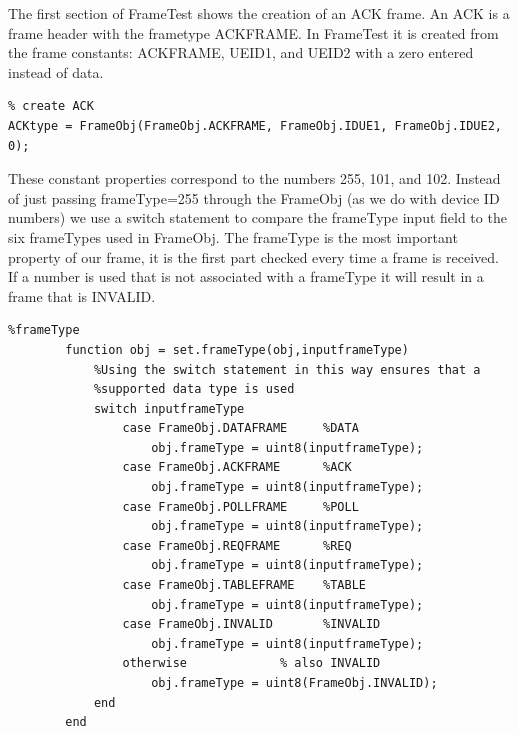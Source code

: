 The first section of FrameTest shows the creation of an ACK frame. An ACK is a frame header with the frametype ACKFRAME. In FrameTest it is created from the frame constants: ACKFRAME, UEID1, and UEID2 with a zero entered instead of data.   
\begin{lstlisting}
% create ACK
ACKtype = FrameObj(FrameObj.ACKFRAME, FrameObj.IDUE1, FrameObj.IDUE2, 0);
\end{lstlisting}

These constant properties correspond to the numbers 255, 101, and 102. Instead of just passing frameType=255 through the FrameObj (as we do with device ID numbers) we use a switch statement to compare the frameType input field to the six frameTypes used in FrameObj. The frameType is the most important property of our frame, it is the first part checked every time a frame is received. If a number is used that is not associated with a frameType it will result in a frame that is INVALID.
\begin{lstlisting} 
%frameType
        function obj = set.frameType(obj,inputframeType)
            %Using the switch statement in this way ensures that a
            %supported data type is used
            switch inputframeType
                case FrameObj.DATAFRAME     %DATA
                    obj.frameType = uint8(inputframeType);
                case FrameObj.ACKFRAME      %ACK
                    obj.frameType = uint8(inputframeType);
                case FrameObj.POLLFRAME     %POLL
                    obj.frameType = uint8(inputframeType);
                case FrameObj.REQFRAME      %REQ
                    obj.frameType = uint8(inputframeType);
                case FrameObj.TABLEFRAME    %TABLE
                    obj.frameType = uint8(inputframeType);
                case FrameObj.INVALID       %INVALID
                    obj.frameType = uint8(inputframeType);
                otherwise             % also INVALID
                    obj.frameType = uint8(FrameObj.INVALID);
            end
        end
\end{lstlisting}

